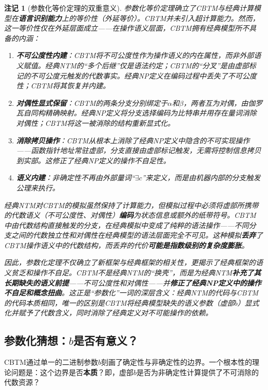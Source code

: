\documentclass{ctexart}
\newtheorem{remark}[theorem]{注记}
\begin{document}
	\begin{remark}[参数化等价定理的双重意义]
		参数化等价定理确立了CBTM与经典计算模型在\textbf{语言识别能力}上的等价性（外延等价）。CBTM并未引入超计算能力。然而，这一等价性仅在外延层面成立——在操作语义层面，CBTM拥有经典模型所不具备的内涵：
		\begin{enumerate}
			\item \textbf{不可公度性内建}：CBTM将不可公度性作为操作语义的内在属性，而非外部语义赋值。经典NTM的``多个后继''仅是语法约定；CBTM的``分叉''是由虚部标记的不可公度元触发的代数事实。经典NP定义在编码过程中丢失了不可公度性；CBTM将其恢复并内建。
			\item \textbf{对偶性显式保留}：CBTM的两条分支分别绑定于$\alpha$和$\beta$，两者互为对偶，由伽罗瓦自同构精确映射。经典NP定义将分支选择编码为比特串并用存在量词消除对偶性；CBTM将这一被消除的结构重新显式化。
			\item \textbf{消除拷贝操作}：CBTM从根本上消除了经典NP定义中隐含的不可实现操作——函数指针地址常驻虚部，分支直接由虚部标记触发，无需将控制信息拷贝到实部。这修正了经典NP定义的操作不自足性。
			\item \textbf{语义内建}：非确定性不再由外部量词``$\exists c$''来定义，而是由机器内部的分支触发公理来执行。
		\end{enumerate}
		经典NTM对CBTM的模拟虽然保持了计算能力，但模拟过程中必须将虚部所携带的代数语义（不可公度性、对偶性）\textbf{编码}为状态信息或额外的纸带符号。CBTM中由代数结构直接触发的分支，在经典模拟中变成了纯粹的语法操作——不同分支之间的代数独立性和对偶性在经典模型的语法层面完全不可见。这种模拟\textbf{丢弃}了CBTM操作语义中的代数结构，而丢弃的代价\textbf{可能是指数级别的复杂度膨胀}。
		
		因此，参数化定理不仅确立了新框架与经典框架的相关性，更揭示了经典框架的语义贫乏和操作不自足。CBTM不是经典NTM的``换壳''，而是为经典NTM\textbf{补充了其长期缺失的语义前提}——不可公度性和对偶性——并\textbf{修正了经典NP定义中的操作不自足和概念扭曲}。这正是``参数化''一词的深层含义：经典NTM的代码与CBTM的代码本质相同，唯一的区别是CBTM将经典模型缺失的语义参数（虚部$b$）显式化并赋予了代数含义，同时消除了经典定义对不可能操作的依赖。
	\end{remark}
	
	\subsection{参数化猜想：$b$是否有意义？}
	
	CBTM通过单一的二进制参数$b$刻画了确定性与非确定性的边界。一个根本性的理论问题是：这个边界是否\textbf{本质}？即，虚部$b$是否为非确定性计算提供了不可消除的代数资源？
	
\end{document}
